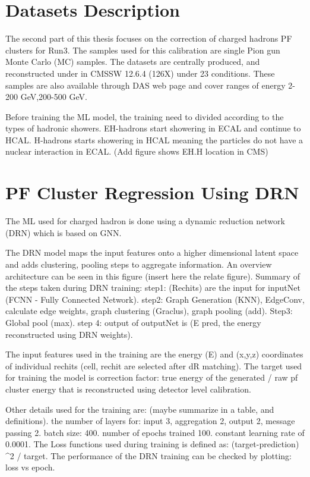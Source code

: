 \section{Datasets Description}
The second part of this thesis focuses on the correction of charged hadrons PF clusters for Run3. The samples used for this calibration are single Pion gun Monte Carlo (MC) samples. The datasets are centrally produced, and reconstructed under in CMSSW 12.6.4 (126X) under 23 conditions. These samples are also available through DAS web page and cover ranges of energy 2-200 GeV,200-500 GeV.

Before training the ML model, the training need to divided according to the types of hadronic showers. EH-hadrons start showering in ECAL and continue to HCAL. H-hadrons starts showering in HCAL meaning the particles do not have a nuclear interaction in ECAL. (Add figure shows EH.H location in CMS)

\section{PF Cluster Regression Using DRN}
The ML used for charged hadron is done using a dynamic reduction network (DRN) which is based on GNN. %

The DRN model maps the input features onto a higher dimensional latent space and adds clustering, pooling steps to aggregate information. An overview architecture can be seen in this figure (insert here the relate figure). Summary of the steps taken during DRN training: 
step1: (Rechits) are the input for inputNet (FCNN - Fully Connected Network). 
step2: Graph Generation (KNN), EdgeConv, calculate edge weights, graph clustering (Graclus), graph pooling (add). 
Step3: Global pool (max).  
step 4: output of outputNet is (E pred, the energy reconstructed using DRN weights).

The input features used in the training are the energy (E) and (x,y,z) coordinates of individual rechits (cell, rechit are selected after dR matching). The target used for training the model is correction factor:  true energy of the generated / raw pf cluster energy that is reconstructed using detector level calibration.

Other details used for the training are:  (maybe summarize in a table, and definitions).  
the number of layers for: input 3, aggregation 2, output 2, message passing 2.  
batch size: 400. 
number of epochs trained 100. 
constant learning rate of 0.0001.  
The Loss functions used during training is defined as: (target-prediction) ^2 / target.  
The performance of the DRN training can be checked by plotting: loss vs epoch.

